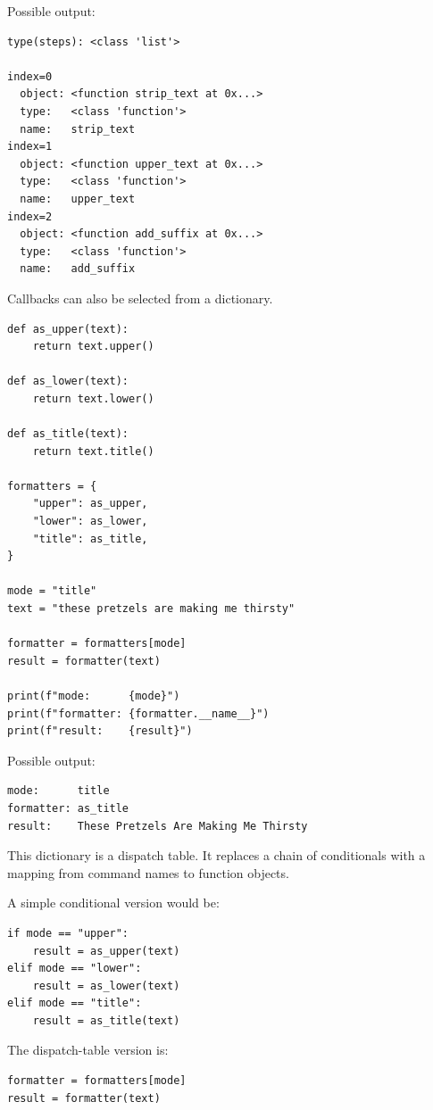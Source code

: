 Possible output:

\begin{verbatim}
type(steps): <class 'list'>

index=0
  object: <function strip_text at 0x...>
  type:   <class 'function'>
  name:   strip_text
index=1
  object: <function upper_text at 0x...>
  type:   <class 'function'>
  name:   upper_text
index=2
  object: <function add_suffix at 0x...>
  type:   <class 'function'>
  name:   add_suffix
\end{verbatim}

Callbacks can also be selected from a dictionary.

\begin{verbatim}
def as_upper(text):
    return text.upper()

def as_lower(text):
    return text.lower()

def as_title(text):
    return text.title()

formatters = {
    "upper": as_upper,
    "lower": as_lower,
    "title": as_title,
}

mode = "title"
text = "these pretzels are making me thirsty"

formatter = formatters[mode]
result = formatter(text)

print(f"mode:      {mode}")
print(f"formatter: {formatter.__name__}")
print(f"result:    {result}")
\end{verbatim}

Possible output:

\begin{verbatim}
mode:      title
formatter: as_title
result:    These Pretzels Are Making Me Thirsty
\end{verbatim}

This dictionary is a dispatch table. It replaces a chain of conditionals with a mapping from command names to function objects.

A simple conditional version would be:

\begin{verbatim}
if mode == "upper":
    result = as_upper(text)
elif mode == "lower":
    result = as_lower(text)
elif mode == "title":
    result = as_title(text)
\end{verbatim}

The dispatch-table version is:

\begin{verbatim}
formatter = formatters[mode]
result = formatter(text)
\end{verbatim}

